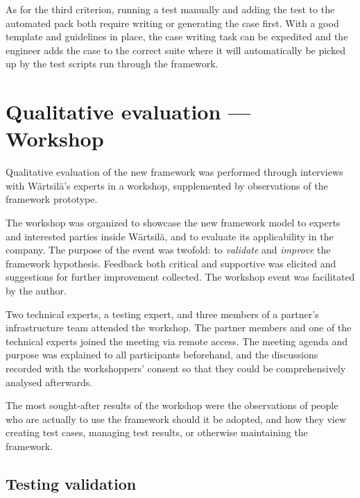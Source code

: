 \documentclass[12pt,a4paper,oneside,pdftex]{report}
\begin{document}
{As for the third criterion, running a test manually and adding the test to the automated pack both require writing or generating the case first. With a good template and guidelines in place, the case writing task can be expedited and the engineer adds the case to the correct suite where it will automatically be picked up by the test scripts run through the framework.

\section{Qualitative evaluation --- Workshop}



Qualitative evaluation of the new framework was performed through interviews with Wärtsilä's experts in a workshop, supplemented by observations of the framework prototype. 

The workshop was organized to showcase the new framework model to experts and interested parties inside Wärtsilä, and to evaluate its applicability in the company. The purpose of the event was twofold: to \emph{validate} and \emph{improve} the framework hypothesis. Feedback both critical and supportive was elicited and suggestions for further improvement collected. The workshop event was facilitated by the author.

Two technical experts, a testing expert, and three members of a partner's infrastructure team attended the workshop. The partner members and one of the technical experts joined the meeting via remote access. The meeting agenda and purpose was explained to all participants beforehand, and the discussions recorded with the workshoppers' consent so that they could be comprehensively analysed afterwards.

The most sought-after results of the workshop were the observations of people who are actually to use the framework should it be adopted, and how they view creating test cases, managing test results, or otherwise maintaining the framework.

\subsection{Testing validation}

}
\end{document}
